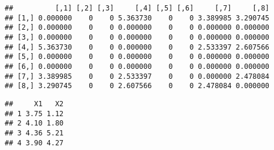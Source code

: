 \documentclass[12pt]{report}\usepackage[]{graphicx}\usepackage[dvipsnames]{xcolor}
\makeatletter
\newenvironment{kframe}{%
 \def\at@end@of@kframe{}%
 \ifinner\ifhmode%
  \def\at@end@of@kframe{\end{minipage}}%
  \begin{minipage}{\columnwidth}%
 \fi\fi%
 \def\FrameCommand##1{\hskip\@totalleftmargin \hskip-\fboxsep
 \colorbox{shadecolor}{##1}\hskip-\fboxsep
     \hskip-\linewidth \hskip-\@totalleftmargin \hskip\columnwidth}%
 \MakeFramed {\advance\hsize-\width
   \@totalleftmargin\z@ \linewidth\hsize
   \@setminipage}}%
 {\par\unskip\endMakeFramed%
 \at@end@of@kframe}
\newenvironment{knitrout}{}{} %
\makeatother
\begin{document}
\begin{knitrout}
\begin{kframe}
{\ttfamily\noindent\itshape\color{messagecolor}{\#\# \\\#\# \ Matrix Distance (distance type = EUC, approach type = MIN):}}\begin{verbatim}
##          [,1] [,2] [,3]     [,4] [,5] [,6]     [,7]     [,8]
## [1,] 0.000000    0    0 5.363730    0    0 3.389985 3.290745
## [2,] 0.000000    0    0 0.000000    0    0 0.000000 0.000000
## [3,] 0.000000    0    0 0.000000    0    0 0.000000 0.000000
## [4,] 5.363730    0    0 0.000000    0    0 2.533397 2.607566
## [5,] 0.000000    0    0 0.000000    0    0 0.000000 0.000000
## [6,] 0.000000    0    0 0.000000    0    0 0.000000 0.000000
## [7,] 3.389985    0    0 2.533397    0    0 0.000000 2.478084
## [8,] 3.290745    0    0 2.607566    0    0 2.478084 0.000000
\end{verbatim}


{\ttfamily\noindent\itshape\color{messagecolor}{\#\# \\\#\# \ The minimum distance is: 2.47808393723861}}

{\ttfamily\noindent\itshape\color{messagecolor}{\#\# \\\#\# \ The closest clusters are: 7, 8}}

{\ttfamily\noindent\itshape\color{messagecolor}{\#\# \\\#\# \ The grouped clusters are added to the solution.}}

{\ttfamily\noindent\itshape\color{messagecolor}{\#\# \\\#\# \ Grouping clusters 7 and cluster 8, it is created a new cluster:}}\begin{verbatim}
##     X1   X2
## 1 3.75 1.12
## 2 4.10 1.80
## 3 4.36 5.21
## 4 3.90 4.27
\end{verbatim}


{\ttfamily\noindent\itshape\color{messagecolor}{\#\# \\\#\# \ The new cluster is added to the solution.}}

{\ttfamily\noindent\itshape\color{messagecolor}{\#\# \\\#\# \_\_\_\_\_\_\_\_\_\_\_\_\_\_\_\_\_\_\_\_\_\_\_\_\_\_\_\_\_\_\_\_\_\_\_\_\_\_\_\_\_\_\_\_\_\_\_\_\_\_\_\_\_\_\_\_\_\_\_\_\_\_\_\_\_\_\_\_\_\_\_\_\_\_\_\_\_\_\_\_\_\_\_\_\_\_\_\_\_\_\_\_\_}}

{\ttfamily\noindent\itshape\color{messagecolor}{\#\# STEP => 4}}


\end{kframe}
\end{knitrout}
\end{document}
